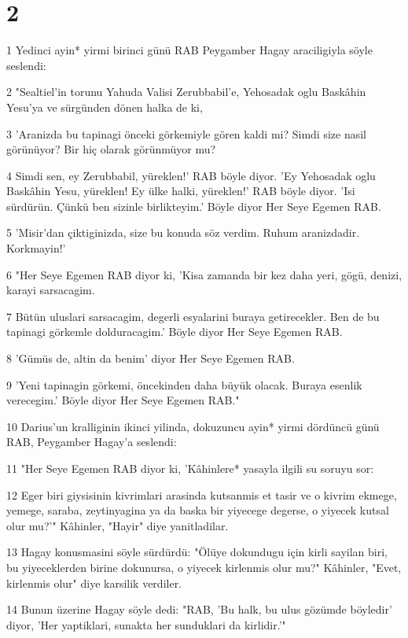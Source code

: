 \chapter{2}

\par 1 Yedinci ayin* yirmi birinci günü RAB Peygamber Hagay araciligiyla söyle seslendi:
\par 2 "Sealtiel'in torunu Yahuda Valisi Zerubbabil'e, Yehosadak oglu Baskâhin Yesu'ya ve sürgünden dönen halka de ki,
\par 3 'Aranizda bu tapinagi önceki görkemiyle gören kaldi mi? Simdi size nasil görünüyor? Bir hiç olarak görünmüyor mu?
\par 4 Simdi sen, ey Zerubbabil, yüreklen!' RAB böyle diyor. 'Ey Yehosadak oglu Baskâhin Yesu, yüreklen! Ey ülke halki, yüreklen!' RAB böyle diyor. 'Isi sürdürün. Çünkü ben sizinle birlikteyim.' Böyle diyor Her Seye Egemen RAB.
\par 5 'Misir'dan çiktiginizda, size bu konuda söz verdim. Ruhum aranizdadir. Korkmayin!'
\par 6 "Her Seye Egemen RAB diyor ki, 'Kisa zamanda bir kez daha yeri, gögü, denizi, karayi sarsacagim.
\par 7 Bütün uluslari sarsacagim, degerli esyalarini buraya getirecekler. Ben de bu tapinagi görkemle dolduracagim.' Böyle diyor Her Seye Egemen RAB.
\par 8 'Gümüs de, altin da benim' diyor Her Seye Egemen RAB.
\par 9 'Yeni tapinagin görkemi, öncekinden daha büyük olacak. Buraya esenlik verecegim.' Böyle diyor Her Seye Egemen RAB."
\par 10 Darius'un kralliginin ikinci yilinda, dokuzuncu ayin* yirmi dördüncü günü RAB, Peygamber Hagay'a seslendi:
\par 11 "Her Seye Egemen RAB diyor ki, 'Kâhinlere* yasayla ilgili su soruyu sor:
\par 12 Eger biri giysisinin kivrimlari arasinda kutsanmis et tasir ve o kivrim ekmege, yemege, saraba, zeytinyagina ya da baska bir yiyecege degerse, o yiyecek kutsal olur mu?'" Kâhinler, "Hayir" diye yanitladilar.
\par 13 Hagay konusmasini söyle sürdürdü: "Ölüye dokundugu için kirli sayilan biri, bu yiyeceklerden birine dokunursa, o yiyecek kirlenmis olur mu?" Kâhinler, "Evet, kirlenmis olur" diye karsilik verdiler.
\par 14 Bunun üzerine Hagay söyle dedi: "RAB, 'Bu halk, bu ulus gözümde böyledir' diyor, 'Her yaptiklari, sunakta her sunduklari da kirlidir.'"
